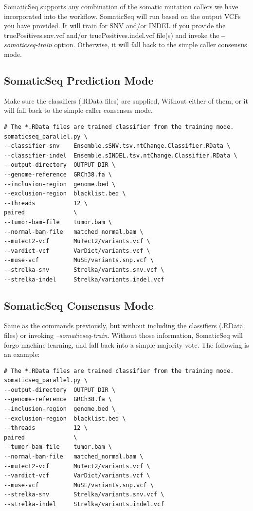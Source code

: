 \documentclass[10pt,letterpaper]{article}
\begin{document}
\begin{sloppypar}
SomaticSeq supports any combination of the somatic mutation callers we have incorporated into the workflow. SomaticSeq will run based on the output VCFs you have provided. It will train for SNV and/or INDEL if you provide the truePositives.snv.vcf and/or truePositives.indel.vcf file(s) and invoke the \textit{\texttt{--}somaticseq-train} option. Otherwise, it will fall back to the simple caller consensus mode.




\subsection{SomaticSeq Prediction Mode} \label{somaticseq_prediction}

Make sure the classifiers (.RData files) are supplied, Without either of them, or it will fall back to the simple caller consensus mode.

\begin{lstlisting}
# The *.RData files are trained classifier from the training mode.
somaticseq_parallel.py \
--classifier-snv    Ensemble.sSNV.tsv.ntChange.Classifier.RData \
--classifier-indel  Ensemble.sINDEL.tsv.ntChange.Classifier.RData \
--output-directory  OUTPUT_DIR \
--genome-reference  GRCh38.fa \
--inclusion-region  genome.bed \
--exclusion-region  blacklist.bed \
--threads           12 \
paired              \
--tumor-bam-file    tumor.bam \
--normal-bam-file   matched_normal.bam \
--mutect2-vcf       MuTect2/variants.vcf \
--vardict-vcf       VarDict/variants.vcf \
--muse-vcf          MuSE/variants.snp.vcf \
--strelka-snv       Strelka/variants.snv.vcf \
--strelka-indel     Strelka/variants.indel.vcf
\end{lstlisting}



\subsection{SomaticSeq Consensus Mode} \label{somaticseq_default_mode}

Same as the commands previously, but without including the classifiers (.RData files) or invoking \textit{--somaticseq-train}. Without those information, SomaticSeq will forgo machine learning, and fall back into a simple majority vote. The following is an example:

\begin{lstlisting}
# The *.RData files are trained classifier from the training mode.
somaticseq_parallel.py \
--output-directory  OUTPUT_DIR \
--genome-reference  GRCh38.fa \
--inclusion-region  genome.bed \
--exclusion-region  blacklist.bed \
--threads           12 \
paired              \
--tumor-bam-file    tumor.bam \
--normal-bam-file   matched_normal.bam \
--mutect2-vcf       MuTect2/variants.vcf \
--vardict-vcf       VarDict/variants.vcf \
--muse-vcf          MuSE/variants.snp.vcf \
--strelka-snv       Strelka/variants.snv.vcf \
--strelka-indel     Strelka/variants.indel.vcf
\end{lstlisting}








\end{sloppypar}
\end{document}
